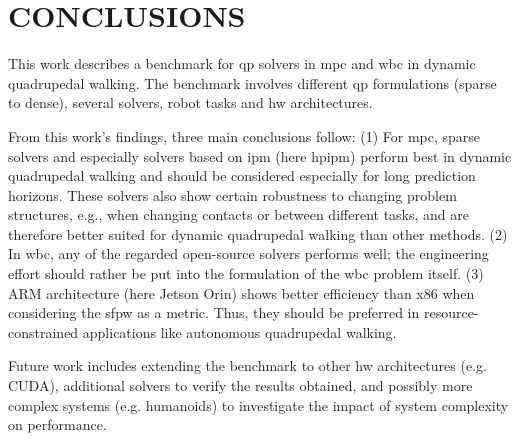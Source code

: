 \section{CONCLUSIONS}%
\label{sec:conclusions} 

This work describes a benchmark for \gls{qp} solvers in \gls{mpc} and \gls{wbc} in dynamic quadrupedal walking. 
The benchmark involves different \gls{qp} formulations (sparse to dense), several solvers, robot tasks and \gls{hw} architectures.

From this work's findings, three main conclusions follow: (1) For \gls{mpc}, sparse solvers and especially solvers based on \gls{ipm} (here \gls{hpipm}) perform best in dynamic quadrupedal walking and should be considered especially for long prediction horizons. These solvers also show certain robustness to changing problem structures, e.g., when changing contacts or between different tasks, and are therefore better suited for dynamic quadrupedal walking than other methods. 
(2) In \gls{wbc}, any of the regarded open-source solvers performs well; the engineering effort should rather be put into the formulation of the \gls{wbc} problem itself. 
(3) ARM architecture (here Jetson Orin) shows better efficiency than x86 when considering the \acrlong{sfpw} as a metric. Thus, they should be preferred in resource-constrained applications like autonomous quadrupedal walking.



Future work includes extending the benchmark to other \gls{hw} architectures (e.g. CUDA), additional solvers to verify the results obtained, and possibly more complex systems (e.g. humanoids) to investigate the impact of system complexity on performance.

        
